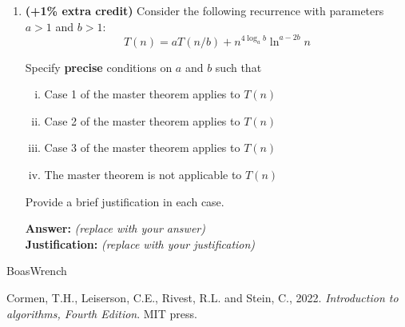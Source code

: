 \documentclass[dvipsnames]{article}
\begin{document}
\begin{enumerate}
\begin{enumerate}
    
\item For $T(n) = 3 T(\sqrt[3]{n}) + n$, the recurrence relation does not satisfy the conditions of the Master Theorem, because $T(\sqrt[3]{n})$ does not match the form $T(n / b)$, where $b > 1$ is a constant. Therefore, the Master Theorem cannot be applied directly.


\item For $T(n) = \frac{1}{3} T(3n) + n \log_3 n$, the recurrence relation does not satisfy the conditions of the Master Theorem, because $b = \frac{1}{3}$ does not match $b>1$. Therefore, the Master Theorem cannot be applied directly.  
  \end{enumerate}
  \color{black}

  \clearpage
  \item \textbf{(+1\% extra credit)} Consider the following recurrence with parameters $a > 1$ and $b > 1$:
  \[
    T(n) = a T(n / b) + n^{4 \log_a b} \ln^{a - 2b}  n
  \]

  Specify \textbf{precise} conditions on $a$ and $b$ such that
  \begin{enumerate}[(i)]
    \item Case 1 of the master theorem applies to $T(n)$
    \item Case 2 of the master theorem applies to $T(n)$
    \item Case 3 of the master theorem applies to $T(n)$
    \item The master theorem is not applicable to $T(n)$
  \end{enumerate}

  Provide a brief justification in each case.

  \color{blue}
  \textbf{Answer:} \emph{(replace with your answer)} \\
  \textbf{Justification: } \emph{(replace with your justification)}
  \color{black}

\end{enumerate}

\begin{thebibliography}{BoasWrench}

Cormen, T.H., Leiserson, C.E., Rivest, R.L. and Stein, C., 2022. \emph{Introduction to algorithms, Fourth Edition}. MIT press.

\end{thebibliography}
\end{document}
